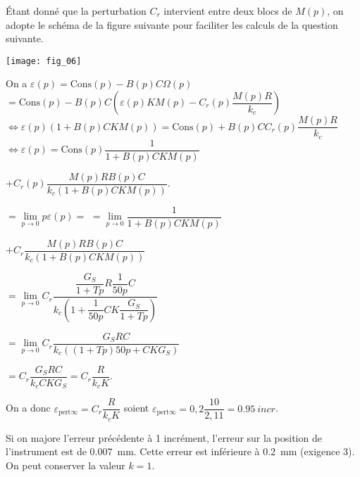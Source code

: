 \ifprof
\else
Étant donné que la perturbation $C_r$ intervient entre deux blocs de $M(p)$, on adopte le schéma de la 
figure suivante pour faciliter les calculs de la question suivante. 

\begin{center}
\texttt{[image: fig\_06]}
\end{center}

\fi


\ifprof
\newpage
\else
\fi

\ifprof
\begin{corrige}
On  a $\varepsilon(p)=\text{Cons}(p)-B(p)C\Omega(p)$ $=\text{Cons}(p)-B(p)C\left( \varepsilon(p) K M(p)- C_r(p) \dfrac{M(p)R}{k_c} \right)$ $ \Leftrightarrow \varepsilon(p) \left(1+ B(p)C  K M(p)\right)=\text{Cons}(p) +B(p)C C_r(p) \dfrac{M(p)R}{k_c}  $
$ \Leftrightarrow \varepsilon(p) =\text{Cons}(p)\dfrac{1}{1+ B(p)C  K M(p)}  $

$+ C_r(p) \dfrac{M(p)R B(p)C}{k_c\left( 1+ B(p)C  K M(p) \right)}  $.

$=\lim\limits_{p\to 0} p \varepsilon (p) = $
$ =\lim\limits_{p\to 0}  \dfrac{1}{1+ B(p)C  K M(p)}  $

$+ C_r \dfrac{M(p)R B(p)C}{k_c\left( 1+ B(p)C  K M(p) \right)}  $

$ =\lim\limits_{p\to 0}  C_r \dfrac{\dfrac{G_S}{1+Tp}R \dfrac{1}{50p}C}{k_c\left( 1+ \dfrac{1}{50p}C  K \dfrac{G_S}{1+Tp} \right)}  $


$ = \lim\limits_{p\to 0}  C_r \dfrac{G_S R C}{k_c\left( \left(1+Tp \right)50p+ C  K G_S \right)}  $

$= C_r \dfrac{G_S R C}{k_c  C  K G_S }= C_r \dfrac{ R }{k_c   K }  $.

On a donc  $\varepsilon_{\text{pert} \infty} = C_r \dfrac{ R }{k_c   K }  $ soient $\varepsilon_{\text{pert} \infty} = 0,2 \dfrac{ 10}{2,1   1 } =\SI{0,95}{incr}$.


\end{corrige}
\else
\fi




\ifprof
\begin{corrige}
Si on majore l'erreur précédente à 1 incrément, l'erreur sur la position de l’instrument est de \SI{0,007}{mm}.
Cette erreur est inférieure à \SI{0,2}{mm} (exigence 3).  On peut conserver la valeur $k=1$.
\end{corrige}
\else
\fi



